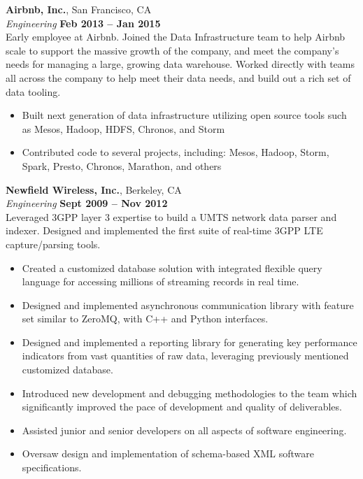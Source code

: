 \documentclass[margin,line]{resume}
\begin{document}
\begin{resume}
    \textbf{Airbnb, Inc.}, San Francisco, CA \vspace{2mm}\\\vspace{1mm}%
    \textsl{Engineering} \hfill \textbf{Feb 2013 -- Jan 2015}\\
    Early employee at Airbnb. Joined the Data Infrastructure team to help
    Airbnb scale to support the massive growth of the company, and meet the
    company's needs for managing a large, growing data warehouse. Worked
    directly with teams all across the company to help meet their data needs,
    and build out a rich set of data tooling.

    \begin{itemize}
    \item Built next generation of data infrastructure utilizing open source
     tools such as Mesos, Hadoop, HDFS, Chronos, and Storm
    \item Contributed code to several projects, including: Mesos, Hadoop,
     Storm, Spark, Presto, Chronos, Marathon, and others
    \end{itemize}

    \textbf{Newfield Wireless, Inc.}, Berkeley, CA \vspace{2mm}\\\vspace{1mm}%
    \textsl{Engineering} \hfill \textbf{Sept 2009 -- Nov 2012}\\
    Leveraged 3GPP layer 3 expertise to build a UMTS network data parser and
    indexer. Designed and implemented the first suite of real-time 3GPP LTE
    capture/parsing tools.

    \begin{itemize}
        \item Created a customized database solution with integrated flexible
        query language for accessing millions of streaming records in real time.
        \item Designed and implemented asynchronous communication library with
        feature set similar to ZeroMQ, with C++ and Python interfaces.
        \item Designed and implemented a reporting library for generating key
        performance indicators from vast quantities of raw data, leveraging
        previously mentioned customized database.
        \item Introduced new development and debugging methodologies to the team
        which significantly improved the pace of development and quality of
        deliverables.
        \item Assisted junior and senior developers on all aspects of software
        engineering.
        \item Oversaw design and implementation of schema-based XML software
        specifications.
    \end{itemize}
    

\end{resume}
\end{document}
